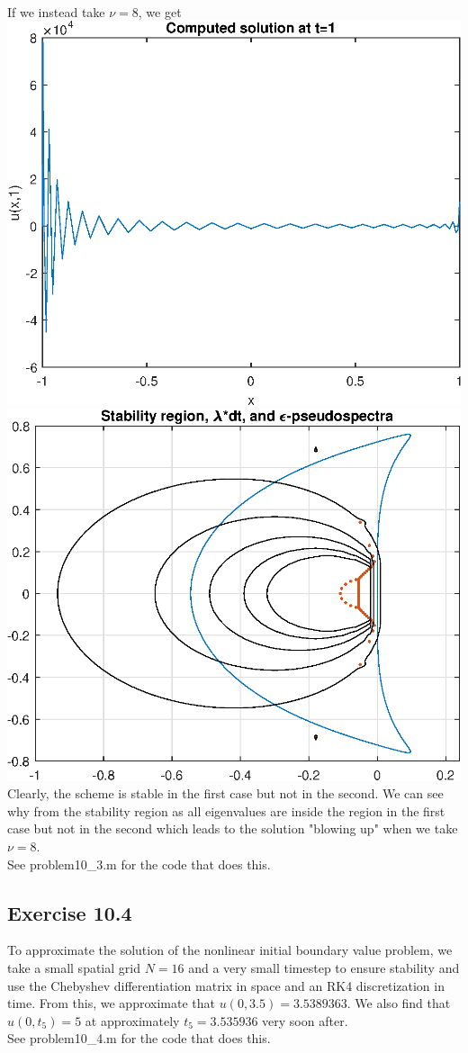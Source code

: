 \documentclass{article}
\begin{document}
\\
If we instead take $\nu=8$, we get \\
\includegraphics[scale=0.8]{sol8.eps}\\
\includegraphics[scale=0.8]{reg8.eps}\\
Clearly, the scheme is stable in the first case but not in the second. We can see why from the stability region as all eigenvalues are inside the region in the first case but not in the second which leads to the solution "blowing up" when we take $\nu=8$. \\
See problem10\_3.m for the code that does this.

\subsection{Exercise 10.4}
To approximate the solution of the nonlinear initial boundary value problem, we take a small spatial grid $N=16$ and a very small timestep to ensure stability and use the Chebyshev differentiation matrix in space and an RK4 discretization in time. From this, we approximate that $u(0,3.5)=3.5389363$. We also find that $u(0,t_5)=5$ at approximately $t_5=3.535936$ very soon after. \\
See problem10\_4.m for the code that does this.
\end{document}
